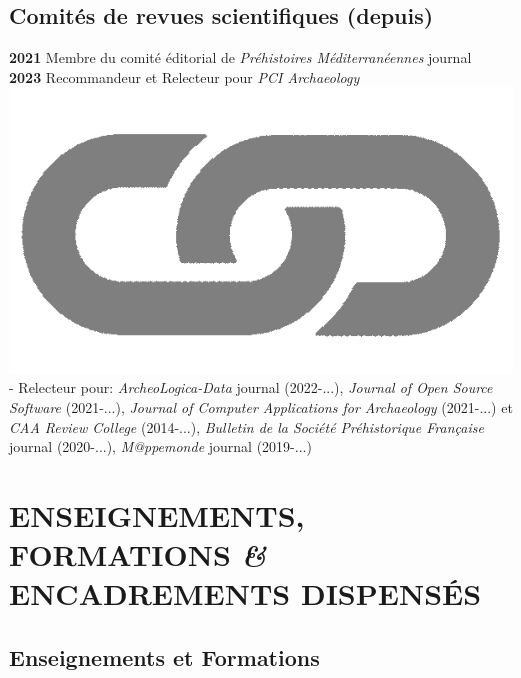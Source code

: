 \documentclass{article}
\begin{document}
\subsection*{Comités de revues scientifiques (depuis)}

\textbf{2021} Membre du comité éditorial de \textit{Pr\'ehistoires M\'editerran\'eennes} journal\\ 
\textbf{2023} Recommandeur et Relecteur pour \textit{PCI Archaeology} \href{https://archaeo.peercommunityin.org/public/user_public_page?userId=1235}{\includegraphics[scale=0.02]{link_grey.png}}\\
- Relecteur pour: \textit{ArcheoLogica-Data} journal (2022-...), \textit{Journal of Open Source Software} (2021-...), \textit{Journal of Computer Applications for Archaeology} (2021-...) et \textit{CAA Review College} (2014-...), \textit{Bulletin de la Soci\'{e}t\'{e} Pr\'{e}historique Fran\c{c}aise} journal (2020-...), \textit{M@ppemonde} journal (2019-...)\\  

\section*{ENSEIGNEMENTS, FORMATIONS \textit{\&} ENCADREMENTS DISPENSÉS}

\subsection*{Enseignements et Formations}
\end{document}
